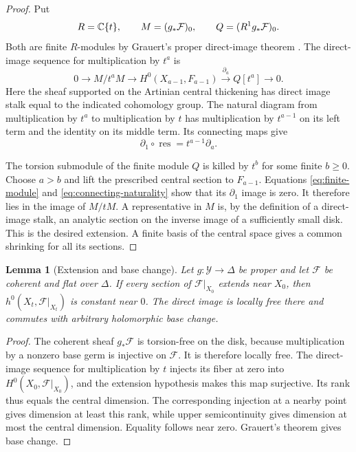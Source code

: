 \documentclass[11pt,a4paper]{article}
\numberwithin{equation}{section}
\newtheorem{lemma}[theorem]{Lemma}
\theoremstyle{definition}
\theoremstyle{remark}
\newcommand{\C}{\mathbb C}\newcommand{\Z}{\mathbb Z}
\begin{document}
\begin{proof}
Put
\[
 R=\C\{t\},\qquad M=(g_*\cF)_0,\qquad Q=(R^1g_*\cF)_0.
\]
Both are finite $R$-modules by Grauert's proper direct-image theorem
\cite{Grauert1960}. The direct-image sequence for multiplication by $t^a$ is
\begin{equation}\label{eq:finite-module}
 0\longrightarrow M/t^aM
 \longrightarrow H^0(X_{a-1},F_{a-1})
 \xrightarrow{\partial_a}Q[t^a]\longrightarrow0.
\end{equation}
Here the sheaf supported on the Artinian central thickening has direct
image stalk equal to the indicated cohomology group. The natural diagram
from multiplication by $t^a$ to multiplication by $t$ has multiplication
by $t^{a-1}$ on its left term and the identity on its middle term. Its
connecting maps give
\begin{equation}\label{eq:connecting-naturality}
 \partial_1\circ\operatorname{res}=t^{a-1}\partial_a.
\end{equation}

The torsion submodule of the finite module $Q$ is killed by $t^b$ for
some finite $b\ge0$. Choose $a>b$ and lift the prescribed central
section to $F_{a-1}$. Equations \eqref{eq:finite-module} and
\eqref{eq:connecting-naturality} show that its $\partial_1$ image is
zero. It therefore lies in the image of $M/tM$. A representative in
$M$ is, by the definition of a direct-image stalk, an analytic
section on the inverse image of a sufficiently small disk. This is the
desired extension. A finite basis of the central space gives a common
shrinking for all its sections.
\end{proof}

\begin{lemma}[Extension and base change]\label{lem:extension-constancy}
Let $g:\mathcal Y\to\Delta$ be proper and let $\mathcal F$ be coherent
and flat over $\Delta$. If every section of $\mathcal F|_{X_0}$ extends
near $X_0$, then $h^0(X_t,\mathcal F|_{X_t})$ is constant near $0$.
The direct image is locally free there and commutes with arbitrary
holomorphic base change.
\end{lemma}

\begin{proof}
The coherent sheaf $g_*\mathcal F$ is torsion-free on the disk, because
multiplication by a nonzero base germ is injective on $\mathcal F$.
It is therefore locally free. The direct-image sequence for multiplication
by $t$ injects its fiber at zero into $H^0(X_0,\mathcal F|_{X_0})$,
and the extension hypothesis makes this map surjective. Its rank thus
equals the central dimension. The corresponding injection at a nearby
point gives dimension at least this rank, while upper semicontinuity
gives dimension at most the central dimension. Equality follows near
zero. Grauert's theorem \cite{Grauert1960} gives base change.
\end{proof}
\end{document}

